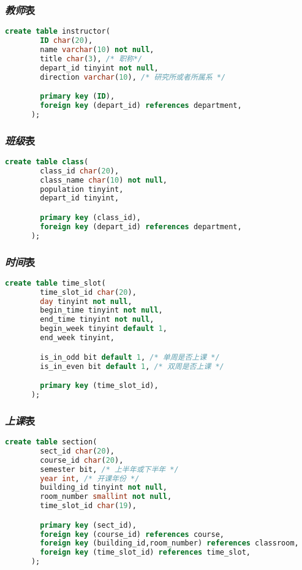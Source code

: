 \documentclass{myreport}
\begin{document}
    \subsubsection{\emph{教师}表}
    \begin{lstlisting}[language=sql]
      create table instructor(
        ID char(20),
        name varchar(10) not null,
        title char(3), /* 职称*/
        depart_id tinyint not null,
        direction varchar(10), /* 研究所或者所属系 */

        primary key (ID),
        foreign key (depart_id) references department,
      );
    \end{lstlisting}

    \subsubsection{\emph{班级}表}
    \begin{lstlisting}[language=sql]
      create table class(
        class_id char(20),
        class_name char(10) not null,
        population tinyint,
        depart_id tinyint,

        primary key (class_id),
        foreign key (depart_id) references department,
      );
    \end{lstlisting}

    \subsubsection{\emph{时间}表}
    \begin{lstlisting}[language=sql]
      create table time_slot(
        time_slot_id char(20),
        day tinyint not null,
        begin_time tinyint not null,
        end_time tinyint not null,
        begin_week tinyint default 1,
        end_week tinyint,

        is_in_odd bit default 1, /* 单周是否上课 */
        is_in_even bit default 1, /* 双周是否上课 */

        primary key (time_slot_id),
      );
    \end{lstlisting}

    \subsubsection{\emph{上课}表}
    \begin{lstlisting}[language=sql]
      create table section(
        sect_id char(20),
        course_id char(20),
        semester bit, /* 上半年或下半年 */
        year int, /* 开课年份 */
        building_id tinyint not null,
        room_number smallint not null,
        time_slot_id char(19),

        primary key (sect_id),
        foreign key (course_id) references course,
        foreign key (building_id,room_number) references classroom,
        foreign key (time_slot_id) references time_slot,
      );

    \end{lstlisting}
\end{document}
